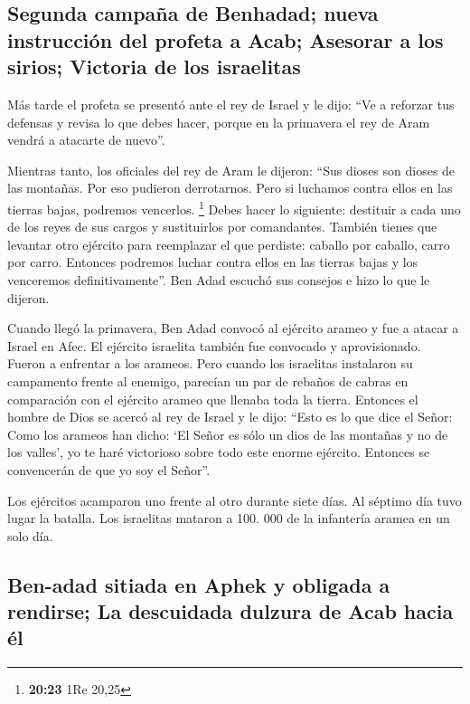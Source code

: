 \hypertarget{segunda-campauxf1a-de-benhadad-nueva-instrucciuxf3n-del-profeta-a-acab-asesorar-a-los-sirios-victoria-de-los-israelitas}{%
\subsection{Segunda campaña de Benhadad; nueva instrucción del profeta a
Acab; Asesorar a los sirios; Victoria de los
israelitas}\label{segunda-campauxf1a-de-benhadad-nueva-instrucciuxf3n-del-profeta-a-acab-asesorar-a-los-sirios-victoria-de-los-israelitas}}

 Más tarde el profeta se presentó ante el rey de Israel y
le dijo: ``Ve a reforzar tus defensas y revisa lo que debes hacer,
porque en la primavera el rey de Aram vendrá a atacarte de nuevo''.

 Mientras tanto, los oficiales del rey de Aram le
dijeron: ``Sus dioses son dioses de las montañas. Por eso pudieron
derrotarnos. Pero si luchamos contra ellos en las tierras bajas,
podremos vencerlos. \footnote{\textbf{20:23} 1Re 20,25} 
Debes hacer lo siguiente: destituir a cada uno de los reyes de sus
cargos y sustituirlos por comandantes.  También tienes
que levantar otro ejército para reemplazar el que perdiste: caballo por
caballo, carro por carro. Entonces podremos luchar contra ellos en las
tierras bajas y los venceremos definitivamente''. Ben Adad escuchó sus
consejos e hizo lo que le dijeron.

 Cuando llegó la primavera, Ben Adad convocó al ejército
arameo y fue a atacar a Israel en Afec.  El ejército
israelita también fue convocado y aprovisionado. Fueron a enfrentar a
los arameos. Pero cuando los israelitas instalaron su campamento frente
al enemigo, parecían un par de rebaños de cabras en comparación con el
ejército arameo que llenaba toda la tierra.  Entonces el
hombre de Dios se acercó al rey de Israel y le dijo: ``Esto es lo que
dice el Señor: Como los arameos han dicho: `El Señor es sólo un dios de
las montañas y no de los valles', yo te haré victorioso sobre todo este
enorme ejército. Entonces se convencerán de que yo soy el Señor''.

 Los ejércitos acamparon uno frente al otro durante siete
días. Al séptimo día tuvo lugar la batalla. Los israelitas mataron a
100. 000 de la infantería aramea en un solo día.

\hypertarget{ben-adad-sitiada-en-aphek-y-obligada-a-rendirse-la-descuidada-dulzura-de-acab-hacia-uxe9l}{%
\subsection{Ben-adad sitiada en Aphek y obligada a rendirse; La
descuidada dulzura de Acab hacia
él}\label{ben-adad-sitiada-en-aphek-y-obligada-a-rendirse-la-descuidada-dulzura-de-acab-hacia-uxe9l}}

